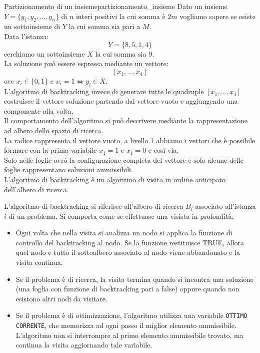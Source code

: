 \documentclass[12pt]{report}
\newcommand{\nmu}{}
\begin{document}
 	\begin{example}{\nmu Partizionamento di un insieme}{partizionamento_insieme}
 		Dato un insieme $Y = \{y_1, y_2, \dots, y_n\}$ di $n$ interi positivi la cui somma è $2m$ vogliamo sapere se esiste un sottoinsieme di $Y$ la cui somma sia pari a $M$. \\
 		Data l'istanza:
 		\[
 		Y = \{8, 5, 1, 4\}
 		\]
 		cerchiamo un sottoinsieme $X$ la cui somma sia 9. \\
 		La soluzione può essere espressa mediante un vettore:
 		\[
 		[x_1, \dots, x_4]
 		\]
 		ove $x_i \in \{0, 1\}$ e $x_i = 1 \iff y_i \in X$. \\
 		L'algoritmo di backtracking invece di generare tutte le quadruple $[x_1, \dots, x_4]$ costruisce il vettore soluzione partendo dal vettore vuoto e aggiungendo una componente alla volta. \\
 		Il comportamento dell'algoritmo si può descrivere mediante la rappresentazione ad albero dello spazio di ricerca. \\
 		La radice rappresenta il vettore vuoto, a livello 1 abbiamo i vettori che è possibile formare con la prima variabile $x_1 = 1$ e $x_1 = 0$ e così via.\\
 		Solo nelle foglie avrò la configurazione completa del vettore e solo alcune delle foglie rappresentano soluzioni ammissibili. \\
 		L'algoritmo di backtracking è un algoritmo di visita in ordine anticipato dell'albero di ricerca.
 	\end{example}
 	L'algoritmo di backtracking si riferisce all'albero di ricerca $B_i$ associato all'istanza $i$ di un problema. Si comporta come se effettuase una visista in profondità.
 	\begin{itemize}
 		\item Ogni volta che nella visita si analizza un nodo si applica la funzione di controllo del backtracking al nodo. Se la funzione restituisce TRUE, allora quel nodo e tutto il sottoalbero associato al nodo viene abbandonato e la visita continua.
 		\item Se il problema è di ricerca, la visita termina quando si incontra una soluzione (una foglia con funzione di backtracking pari a false) oppure quando non esistono altri nodi da visitare.
 		\item Se il problema è di ottimizzazione, l'algoritmo utilizza una variabile \texttt{OTTIMO CORRENTE}, che memorizza ad ogni passo il miglior elemento ammissibile. L'algoritmo non si interrompre al primo elemento ammissibile trovato, ma continua la visita aggiornando tale variabile.
 	\end{itemize}
\end{document}
